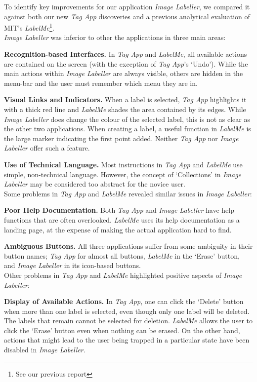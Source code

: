 \documentclass[11pt,twocolumn]{article}
\begin{document}
To identify key improvements for our application \emph{Image Labeller}, we compared it against both our new \emph{Tag App} discoveries and a previous analytical evaluation of MIT’s \emph{LabelMe}\footnote{See our previous
report}.\\

\noindent \emph{Image Labeller} was inferior to other the applications in three main areas:

\textbf{Recognition-based Interfaces.} In \emph{Tag App} and \emph{LabelMe}, all available actions are contained on the screen (with the exception of \emph{Tag App}’s `Undo'). While the main actions within \emph{Image Labeller} are always visible,
others are hidden in the menu-bar and the user must remember which menu they are in. 

\textbf{Visual Links and Indicators.} When a label is selected, \emph{Tag App}
highlights it with a thick red line and \emph{LabelMe} shades the area contained by
its edges. While \emph{Image Labeller} does change the colour of the selected label,
this is not as clear as the other two applications. When creating a label, a
useful function in \emph{LabelMe} is the large marker indicating the first point
added. Neither \emph{Tag App} nor \emph{Image Labeller} offer such a feature.

\textbf{Use of Technical Language.} Most instructions in \emph{Tag App} and
\emph{LabelMe} use simple, non-technical language. However, the concept of
`Collections' in \emph{Image Labeller} may be considered too abstract for the novice
user. \\

\noindent Some problems in \emph{Tag App} and \emph{LabelMe} revealed similar issues
in \emph{Image Labeller}:

\textbf{Poor Help Documentation.} Both \emph{Tag App} and \emph{Image Labeller} have
help functions that are often overlooked. \emph{LabelMe} uses its help documentation
as a landing page, at the expense of making the actual application hard to
find. 

\textbf{Ambiguous Buttons.} All three applications suffer from some
ambiguity in their button names; \emph{Tag App} for almost all buttons, \emph{LabelMe} in the
`Erase' button, and \emph{Image Labeller} in its icon-based buttons. \\

\noindent Other problems in \emph{Tag App} and \emph{LabelMe} highlighted positive aspects of
\emph{Image Labeller}:

\textbf{Display of Available Actions.} In \emph{Tag App}, one can click the
`Delete' button when more than one label is selected, even though only one
label will be deleted. The labels that remain cannot be selected for deletion.
\emph{LabelMe} allows the user to click the `Erase' button even when nothing can be
erased. On the other hand, actions that might lead to the user being trapped in
a particular state have been disabled in \emph{Image Labeller}. \\
\end{document}
